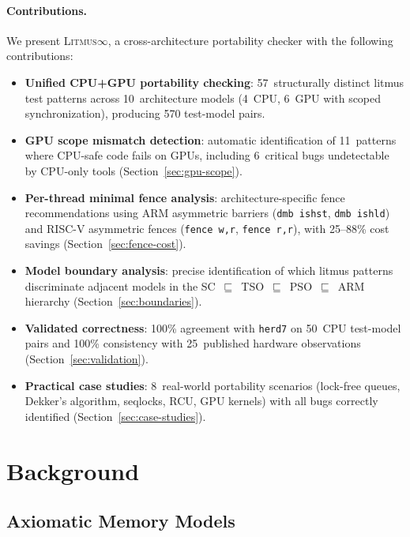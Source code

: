 \documentclass[10pt]{article}
\newcommand{\litmus}{\textsc{Litmus$\infty$}}
\begin{document}
\paragraph{Contributions.} We present \litmus{}, a cross-architecture
portability checker with the following contributions:

\begin{itemize}[nosep]
\item \textbf{Unified CPU+GPU portability checking}: 57~structurally
      distinct litmus test patterns across 10~architecture models (4~CPU,
      6~GPU with scoped synchronization), producing 570 test-model pairs.
\item \textbf{GPU scope mismatch detection}: automatic identification of
      11~patterns where CPU-safe code fails on GPUs, including 6~critical
      bugs undetectable by CPU-only tools (Section~\ref{sec:gpu-scope}).
\item \textbf{Per-thread minimal fence analysis}: architecture-specific
      fence recommendations using ARM asymmetric barriers
      (\texttt{dmb~ishst}, \texttt{dmb~ishld}) and RISC-V asymmetric
      fences (\texttt{fence~w,r}, \texttt{fence~r,r}), with 25--88\%
      cost savings (Section~\ref{sec:fence-cost}).
\item \textbf{Model boundary analysis}: precise identification of which
      litmus patterns discriminate adjacent models in the
      SC~$\sqsubseteq$~TSO~$\sqsubseteq$~PSO~$\sqsubseteq$~ARM hierarchy
      (Section~\ref{sec:boundaries}).
\item \textbf{Validated correctness}: 100\% agreement with \texttt{herd7}
      on 50~CPU test-model pairs and 100\% consistency with 25~published
      hardware observations (Section~\ref{sec:validation}).
\item \textbf{Practical case studies}: 8~real-world portability scenarios
      (lock-free queues, Dekker's algorithm, seqlocks, RCU, GPU kernels)
      with all bugs correctly identified (Section~\ref{sec:case-studies}).
\end{itemize}

\section{Background}
\label{sec:background}

\subsection{Axiomatic Memory Models}
\end{document}

